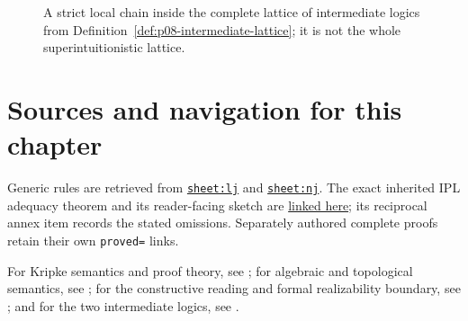 \begin{figure}[htbp]
\centering
{}
\caption{A strict local chain inside the complete lattice of intermediate
logics from Definition~\ref{def:p08-intermediate-lattice}; it is not the whole
superintuitionistic lattice.}
\label{fig:p08-intermediate-lattice}
\end{figure}

\section{Sources and navigation for this chapter}

Generic rules are retrieved from
\hyperref[sheet:lj]{\texttt{sheet:lj}} and
\hyperref[sheet:nj]{\texttt{sheet:nj}}.  The exact inherited IPL adequacy
theorem and its reader-facing sketch are
\hyperref[thm:p08-source-ipl-adequacy]{linked here}; its reciprocal annex item
records the stated omissions.  Separately authored complete proofs retain
their own \texttt{proved=} links.

For Kripke semantics and proof theory, see
\cite{Kripke1965,TroelstraSchwichtenberg2000,TroelstraVanDalen1988}; for
algebraic and topological semantics, see
\cite{RasiowaSikorski1963,McKinseyTarski1946}; for the constructive reading and
formal realizability boundary, see
\cite{Brouwer1908,Heyting1956,Kleene1945}; and for the two intermediate logics,
see \cite{Jankov1968WeakExcludedMiddle,Dummett1959}.
